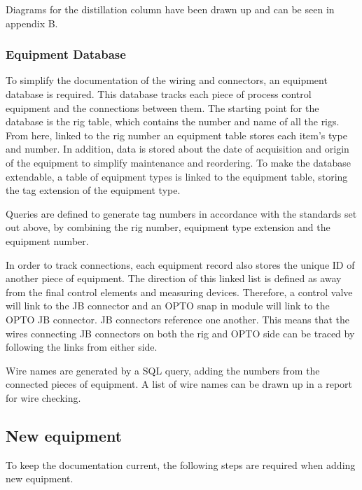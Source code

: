 Diagrams for the distillation column have been drawn up and can be seen in appendix B.

\subsubsection{Equipment Database}
To simplify the documentation of the wiring and connectors, an equipment database is required.  This database tracks each piece of process control equipment and the connections between them.
The starting point for the database is the rig table, which contains the number and name of all the rigs.  From here, linked to the rig number an equipment table stores each item's type and number.  In addition, data is stored about the date of acquisition and origin of the equipment to simplify maintenance and reordering.  To make the database extendable, a table of equipment types is linked to the equipment table, storing the tag extension of the equipment type. 

Queries are defined to generate tag numbers in accordance with the standards set out above, by combining the rig number, equipment type extension and the equipment number.

In order to track connections, each equipment record also stores the unique ID of another piece of equipment.  The direction of this linked list is defined as away from the final control elements and measuring devices.  Therefore, a control valve will link to the JB connector and an OPTO snap in module will link to the OPTO JB connector.  JB connectors reference one another.  This means that the wires connecting JB connectors on both the rig and OPTO side can be traced by following the links from either side.

Wire names are generated by a SQL query, adding the numbers from the connected pieces of equipment.  A list of wire names can be drawn up in a report for wire checking.

\subsection{New equipment}
To keep the documentation current, the following steps are required when adding new equipment.

